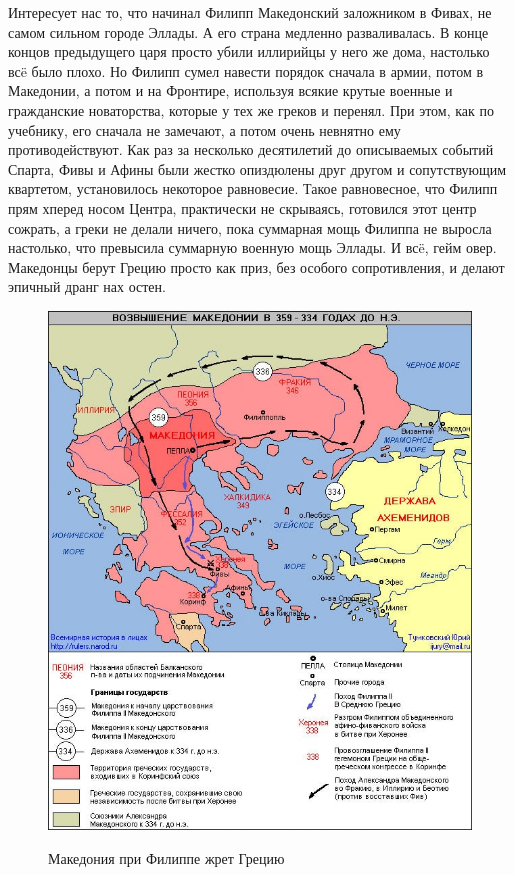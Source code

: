 Интересует нас то, что начинал Филипп Македонский заложником в Фивах, не самом сильном городе Эллады. А его страна медленно разваливалась. В конце концов предыдущего царя просто убили иллирийцы у него же дома, настолько всë было плохо. Но Филипп сумел навести порядок сначала в армии, потом в Македонии, а потом и на Фронтире, используя всякие крутые военные и гражданские новаторства, которые у тех же греков и перенял. При этом, как по учебнику, его сначала не замечают, а потом очень невнятно ему противодействуют. Как раз за несколько десятилетий до описываемых событий Спарта, Фивы и Афины были жестко опиздюлены друг другом и сопутствующим квартетом, установилось некоторое равновесие. Такое равновесное, что Филипп прям хперед носом Центра, практически не скрываясь, готовился этот центр сожрать, а греки не делали ничего, пока суммарная мощь Филиппа не выросла настолько, что превысила суммарную военную мощь Эллады. И всë, гейм овер. Македонцы берут Грецию просто как приз, без особого сопротивления, и делают эпичный дранг нах остен.
\begin{figure}[h!tb]
	\centering\includegraphics[scale=0.4]{regional_hehemons/1613656499119414977.png}
	\label{fig:heh3} %
	\caption{Македония при Филиппе жрет Грецию}
\end{figure}
